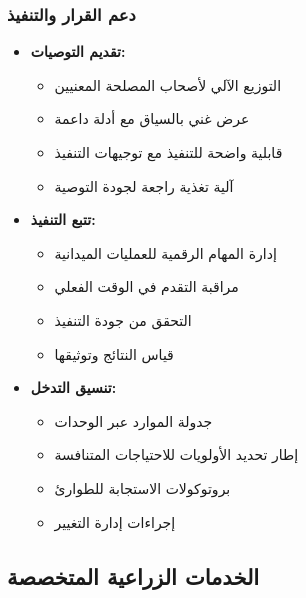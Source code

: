 \subsubsection{دعم القرار والتنفيذ}
\begin{itemize}
    \item \textbf{تقديم التوصيات:}
    \begin{itemize}
        \item التوزيع الآلي لأصحاب المصلحة المعنيين
        \item عرض غني بالسياق مع أدلة داعمة
        \item قابلية واضحة للتنفيذ مع توجيهات التنفيذ
        \item آلية تغذية راجعة لجودة التوصية
    \end{itemize}
    
    \item \textbf{تتبع التنفيذ:}
    \begin{itemize}
        \item إدارة المهام الرقمية للعمليات الميدانية
        \item مراقبة التقدم في الوقت الفعلي
        \item التحقق من جودة التنفيذ
        \item قياس النتائج وتوثيقها
    \end{itemize}
    
    \item \textbf{تنسيق التدخل:}
    \begin{itemize}
        \item جدولة الموارد عبر الوحدات
        \item إطار تحديد الأولويات للاحتياجات المتنافسة
        \item بروتوكولات الاستجابة للطوارئ
        \item إجراءات إدارة التغيير
    \end{itemize}
\end{itemize}

\subsection{الخدمات الزراعية المتخصصة}

